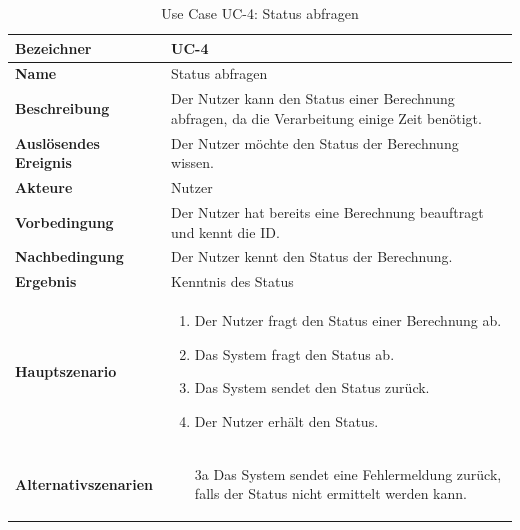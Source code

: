 \begin{table}[ht]
\centering
  \begin{tabular}{ l | p{10cm} }
	\hline
	\rowcolor{gray}
	\textbf{Bezeichner}	&	\textbf{UC-4}\\ \hline
	\textbf{Name}			&	Status abfragen\\ \hline
	\textbf{Beschreibung}	&	Der Nutzer kann den Status einer Berechnung abfragen, da die Verarbeitung einige Zeit benötigt.\\ \hline
	\textbf{Auslösendes Ereignis}&	Der Nutzer möchte den Status der Berechnung wissen.\\ \hline
	\textbf{Akteure}		&	Nutzer\\ \hline
	\textbf{Vorbedingung}	&	Der Nutzer hat bereits eine Berechnung beauftragt und kennt die ID.\\ \hline
	\textbf{Nachbedingung}	&	Der Nutzer kennt den Status der Berechnung.\\ \hline
	\textbf{Ergebnis}		&	Kenntnis des Status\\ \hline
	\textbf{Hauptszenario}	&	\begin{enumerate}
					\item Der Nutzer fragt den Status einer Berechnung ab.
					\item Das System fragt den Status ab.
					\item Das System sendet den Status zurück.
					\item Der Nutzer erhält den Status.
					\end{enumerate}
					\\ \hline
	\textbf{Alternativszenarien}	&	\begin{enumerate}
					\item[3a] Das System sendet eine Fehlermeldung zurück, falls der Status nicht ermittelt werden kann.
					\end{enumerate}
					\\ \hline
  \end{tabular}
   \caption{Use Case UC-4: Status abfragen}\label{table:use_case_4}
\end{table}

